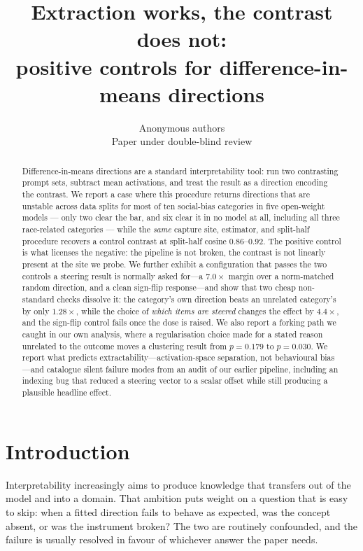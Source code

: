 \documentclass{article}
\title{Extraction works, the contrast does not:\\
positive controls for difference-in-means directions}
\author{Anonymous authors\\Paper under double-blind review}
\begin{document}
\maketitle

\begin{abstract}
Difference-in-means directions are a standard interpretability tool: run two
contrasting prompt sets, subtract mean activations, and treat the result as a
direction encoding the contrast. We report a case where this procedure returns
directions that are unstable across data splits for most of ten social-bias
categories in five open-weight models --- only two clear the bar, and six clear
it in no model at all, including all three race-related categories --- while the
\emph{same} capture site, estimator, and split-half procedure recovers a control
contrast at split-half cosine $0.86$--$0.92$. The positive control is what licenses the negative: the
pipeline is not broken, the contrast is not linearly present at the site we
probe. We further exhibit a configuration that passes the two controls
a steering result is normally asked for---a $7.0\times$ margin over a
norm-matched random direction, and a clean sign-flip response---and show that
two cheap non-standard checks dissolve it: the category's own direction beats an
unrelated category's by only $1.28\times$, while the choice of \emph{which items
are steered} changes the effect by $4.4\times$, and the sign-flip control fails
once the dose is raised. We also report a forking path we caught in our own
analysis, where a regularisation choice made for a stated reason unrelated to
the outcome moves a clustering result from $p=0.179$ to $p=0.030$. We report what
predicts extractability---activation-space separation, not behavioural
bias---and catalogue silent failure modes from an audit of our earlier pipeline,
including an indexing bug that reduced a steering vector to a scalar offset while
still producing a plausible headline effect.
\end{abstract}

\section{Introduction}

Interpretability increasingly aims to produce knowledge that transfers out of
the model and into a domain. That ambition puts weight on a question that is
easy to skip: when a fitted direction fails to behave as expected, was the
concept absent, or was the instrument broken? The two are routinely confounded,
and the failure is usually resolved in favour of whichever answer the paper
needs.
\end{document}
